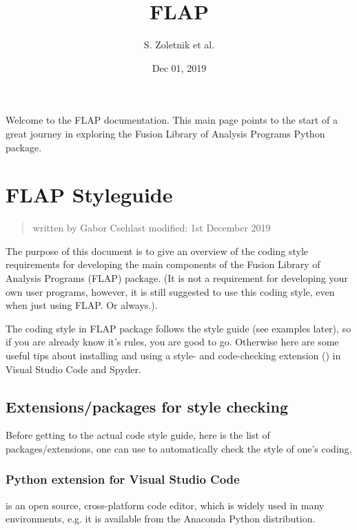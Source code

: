 \documentclass[letterpaper,10pt,english]{sphinxmanual}
\title{FLAP}
\date{Dec 01, 2019}
\author{S.\@{} Zoletnik et al.\@{}}
\begin{document}
\pagestyle{empty}
\sphinxmaketitle
\pagestyle{plain}
\sphinxtableofcontents
\pagestyle{normal}
\label{\detokenize{index::doc}}


Welcome to the FLAP documentation. This main page points to the start
of a great journey in exploring the Fusion Library of Analysis Programs
Python package.


\chapter{FLAP Styleguide}
\label{\detokenize{styleguide:flap-styleguide}}\label{\detokenize{styleguide::doc}}\begin{quote}

written by Gabor Csehlast modified: 1st December 2019
\end{quote}

The purpose of this document is to give an overview of the coding style requirements for developing the main components of the Fusion Library of Analysis Programs (FLAP) package. (It is not a requirement for developing your own user programs, however, it is still suggested to use this coding style, even when just using FLAP. Or always.).

The coding style in FLAP package follows the  style guide (see examples later), so if you are already know it’s rules, you are good to go. Otherwise here are some useful tips about installing and using a style- and code-checking extension () in Visual Studio Code and Spyder.


\section{Extensions/packages for style checking}
\label{\detokenize{styleguide:extensions-packages-for-style-checking}}
Before getting to the actual code style guide, here is the list of packages/extensions, one can use to automatically check the style of one’s coding.


\subsection{Python extension for Visual Studio Code}
\label{\detokenize{styleguide:python-extension-for-visual-studio-code}}
 is an open source, cross-platform code editor, which is widely used in many environments, e.g. it is available from the Anaconda Python distribution.
\end{document}
